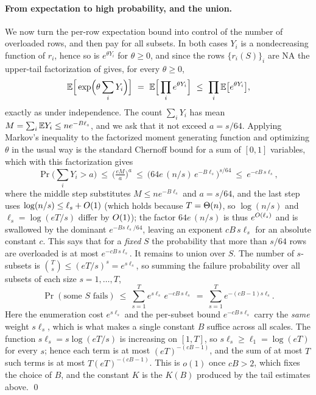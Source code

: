 \paragraph{From expectation to high probability, and the union.}
We now turn the per-row expectation bound into control of the number of overloaded rows, and then pay for all subsets. In
both cases $Y_i$ is a nondecreasing function of $r_i$, hence so is $e^{\theta Y_i}$ for $\theta\ge 0$, and since the rows
$\{r_i(S)\}_i$ are NA the upper-tail factorization of  gives, for every $\theta\ge0$,
\[
  \E\Big[\exp\!\Big(\theta\sum_i Y_i\Big)\Big]\ =\ \E\Big[\prod_i e^{\theta Y_i}\Big]\ \le\ \prod_i\E\big[e^{\theta Y_i}\big],
\]
exactly as under independence. The count $\sum_i Y_i$ has mean $M=\sum_i\mathbb{E} Y_i\le n e^{-B\ell_s}$, and we ask that it not
exceed $a=s/64$. Applying Markov's inequality to the factorized moment generating function and optimizing $\theta$ in the
usual way is the standard Chernoff bound for a sum of $[0,1]$ variables, which with this factorization gives
\[
  \Pr\Big(\sum_i Y_i>a\Big)\ \le\ \Big(\tfrac{eM}{a}\Big)^{a}\ \le\ \big(64e\,(n/s)\,e^{-B\ell_s}\big)^{s/64}\ \le\ e^{-cB\,s\ell_s},
\]
where the middle step substitutes $M\le n e^{-B\ell_s}$ and $a=s/64$, and the last step uses $\log(n/s)\le\ell_s+O(1)$
(which holds because $T=\Theta(n)$, so $\log(n/s)$ and $\ell_s=\log(eT/s)$ differ by $O(1)$); the factor $64e\,(n/s)$ is thus
$e^{O(\ell_s)}$ and is swallowed by the dominant $e^{-Bs\ell_s/64}$, leaving an exponent $cB\,s\ell_s$ for an absolute
constant $c$. This says that for a \emph{fixed} $S$ the probability that more than $s/64$ rows are overloaded is at most
$e^{-cB\,s\ell_s}$. It remains to union over $S$. The number of $s$-subsets is $\binom{T}{s}\le(eT/s)^s=e^{s\ell_s}$, so
summing the failure probability over all subsets of each size $s=1,\dots,T$,
\[
  \Pr(\text{some }S\text{ fails})\ \le\ \sum_{s=1}^{T} e^{s\ell_s}\,e^{-cB\,s\ell_s}\ =\ \sum_{s=1}^{T} e^{-(cB-1)s\ell_s}.
\]
Here the enumeration cost $e^{s\ell_s}$ and the per-subset bound $e^{-cB\,s\ell_s}$ carry the \emph{same} weight $s\ell_s$,
which is what makes a single constant $B$ suffice across all scales. The function $s\ell_s=s\log(eT/s)$ is increasing on
$[1,T]$, so $s\ell_s\ge\ell_1=\log(eT)$ for every $s$; hence each term is at most $(eT)^{-(cB-1)}$, and the sum of at most
$T$ such terms is at most $T(eT)^{-(cB-1)}$. This is $o(1)$ once $cB>2$, which fixes the choice of $B$, and the constant $K$
is the $K(B)$ produced by the tail estimates above. \qed

